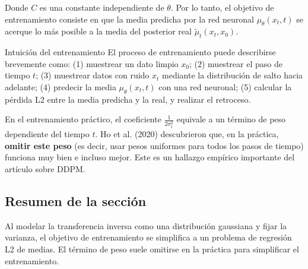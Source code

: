 Donde $C$ es una constante independiente de $\theta$. Por lo tanto, el objetivo de entrenamiento consiste en que la media predicha por la red neuronal $\mu_\theta(x_t, t)$ se acerque lo más posible a la media del posterior real $\tilde{\mu}_t(x_t, x_0)$.

\begin{importantbox}{Intuición del entrenamiento}
El proceso de entrenamiento puede describirse brevemente como: (1) muestrear un dato limpio $x_0$; (2) muestrear el paso de tiempo $t$; (3) muestrear datos con ruido $x_t$ mediante la distribución de salto hacia adelante; (4) predecir la media $\mu_\theta(x_t, t)$ con una red neuronal; (5) calcular la pérdida L2 entre la media predicha y la real, y realizar el retroceso.
\end{importantbox}

En el entrenamiento práctico, el coeficiente $\frac{1}{2\sigma_t^2}$ equivale a un término de peso dependiente del tiempo $t$. Ho et al. (2020) descubrieron que, en la práctica, \textbf{omitir este peso} (es decir, usar pesos uniformes para todos los pasos de tiempo) funciona muy bien e incluso mejor. Este es un hallazgo empírico importante del artículo sobre DDPM.

\subsection{Resumen de la sección}

Al modelar la transferencia inversa como una distribución gaussiana y fijar la varianza, el objetivo de entrenamiento se simplifica a un problema de regresión L2 de medias. El término de peso suele omitirse en la práctica para simplificar el entrenamiento.




